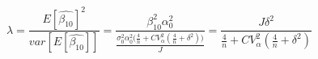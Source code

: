 \begin{equation}
\label{eq:lambda}
\lambda = \frac{E[\hat{\beta_{10}}]^2}{var[E[\hat{\beta_{10}}]]} = \frac{\beta_{10}^2\alpha_0^2}{\frac{\sigma_0^2\alpha_0^2\Big(\frac{4}{n} + CV_{\alpha}^2(\frac{4}{n} + \delta^2)\Big)}{J}} = \frac{J\delta^2}{\frac{4}{n}+CV_{\alpha}^2(\frac{4}{n} + \delta^2)}
\end{equation}